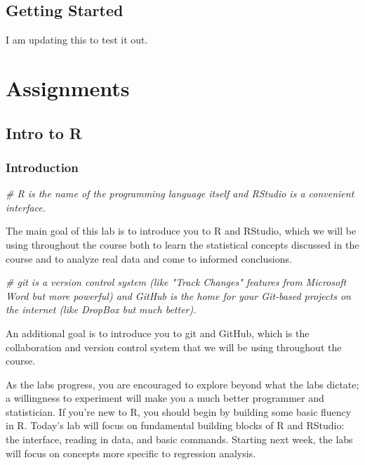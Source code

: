 \documentclass[]{book}
\newenvironment{Shaded}{\begin{snugshade}}{\end{snugshade}}
\newcommand{\CommentTok}[1]{\textcolor[rgb]{0.56,0.35,0.01}{\textit{#1}}}
\begin{document}
\chapter{Getting Started}\label{getstarted}

I am updating this to test it out.

\part{Assignments}\label{part-assignments}

\chapter{Intro to R}\label{intro-to-r}

\section{Introduction}\label{introduction}

\begin{Shaded}
\begin{Highlighting}[]
\CommentTok{# R is the name of the programming language itself and RStudio is a convenient interface.}
\end{Highlighting}
\end{Shaded}

The main goal of this lab is to introduce you to R and RStudio, which we
will be using throughout the course both to learn the statistical
concepts discussed in the course and to analyze real data and come to
informed conclusions.

\begin{Shaded}
\begin{Highlighting}[]
\CommentTok{# git is a version control system (like "Track Changes" features from Microsoft Word but more powerful) and GitHub is the home for your Git-based projects on the internet (like DropBox but much better).}
\end{Highlighting}
\end{Shaded}

An additional goal is to introduce you to git and GitHub, which is the
collaboration and version control system that we will be using
throughout the course.

As the labs progress, you are encouraged to explore beyond what the labs
dictate; a willingness to experiment will make you a much better
programmer and statistician. If you're new to R, you should begin by
building some basic fluency in R. Today's lab will focus on fundamental
building blocks of R and RStudio: the interface, reading in data, and
basic commands. Starting next week, the labs will focus on concepts more
specific to regression analysis.
\end{document}
